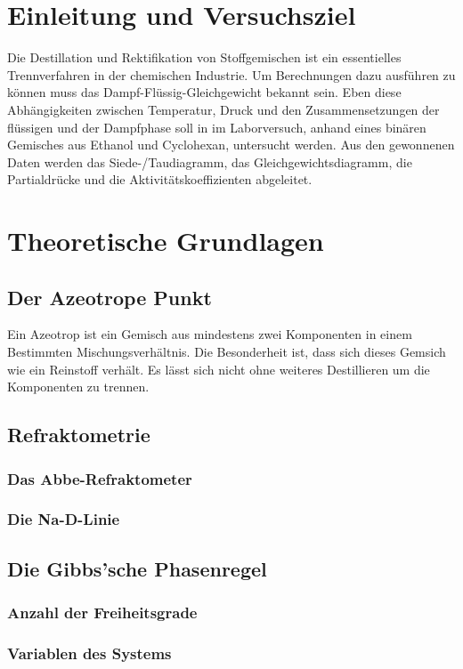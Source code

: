 \section{Einleitung und Versuchsziel}
\label{sec:aufgabenstellung}
Die Destillation und Rektifikation von Stoffgemischen ist ein essentielles Trennverfahren in der chemischen Industrie. Um Berechnungen dazu ausführen zu können muss das Dampf-Flüssig-Gleichgewicht bekannt sein. Eben diese Abhängigkeiten zwischen Temperatur, Druck und den Zusammensetzungen der flüssigen und der Dampfphase soll in im Laborversuch, anhand eines binären Gemisches aus Ethanol und Cyclohexan, untersucht werden. Aus den gewonnenen Daten werden das Siede-/Taudiagramm, das Gleichgewichtsdiagramm, die Partialdrücke und die Aktivitätskoeffizienten abgeleitet. 

\section{Theoretische Grundlagen}

\subsection{Der Azeotrope Punkt}
Ein Azeotrop ist ein Gemisch aus mindestens zwei Komponenten in einem Bestimmten Mischungsverhältnis. Die Besonderheit ist, dass sich dieses Gemsich wie ein Reinstoff verhält. Es lässt sich nicht ohne weiteres Destillieren um die Komponenten zu trennen.
\subsection{Refraktometrie}
\subsubsection*{Das Abbe-Refraktometer}
\subsubsection*{Die Na-D-Linie}

\subsection{Die Gibbs'sche Phasenregel}

\subsubsection*{Anzahl der Freiheitsgrade}
\subsubsection*{Variablen des Systems}


